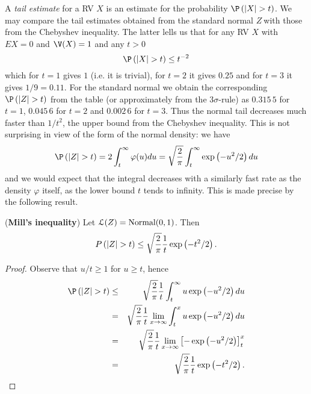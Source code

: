 A \textit{tail estimate} for a RV $X$ is an estimate for the probability $%
\P \left( \left\vert X\right\vert >t\right) $. We may compare the tail
estimates obtained from the standard normal $Z\ $with those from the
Chebyshev inequality. The latter lells us that for any RV $X$ with $EX=0$
and $\V(X)=1$ and any $t>0$ 
\begin{equation*}
\P \left( \left\vert X\right\vert >t\right) \leq t^{-2}
\end{equation*}%
which for $t=1$ gives $1$ (i.e. it is trivial), for $t=2$ it gives $0.25$
and for $t=3$ it gives $1/9=0.11$. For the standard normal we obtain the
corresponding $\P \left( \left\vert Z\right\vert >t\right) $ from the table
(or approximately from the $3\sigma $-rule) as $0.315\,5$ for $t=1$, $%
0.045\,6$ for $t=2$ and $0.002\,6$ for $t=3$. Thus the normal tail decreases
much faster than $1/t^{2}$, the upper bound from the Chebyshev inequality.
This is not surprising in view of the form of the normal density: we have 
\begin{equation*}
\P \left( \left\vert Z\right\vert >t\right) =2\int_{t}^{\infty }\varphi
(u)du=\sqrt{\frac{2}{\pi }}\int_{t}^{\infty }\exp \left( -u^{2}/2\right) du
\end{equation*}%
and we would expect that the integral decreases with a similarly fast rate
as the density $\varphi $ itself, as the lower bound $t$ tends to infinity.
This is made precise by the following result.

\begin{prop}
(\textbf{Mill's inequality}) Let $\mathcal{L}(Z)=\mbox{{\rm Normal}}(0,1)$. Then 
\begin{equation}
P\left( \left\vert Z\right\vert >t\right) \leq \sqrt{\frac{2}{\pi }}\frac{1}{%
t}\exp \left( -t^{2}/2\right) .  \label{mills-ineq}
\end{equation}
\end{prop}

\begin{proof}
Observe that $u/t\geq 1$ for $u\geq t$, hence 
\begin{eqnarray*}
\P \left( \left\vert Z\right\vert >t\right) &\leq &\sqrt{\frac{2}{\pi }}%
\frac{1}{t}\int_{t}^{\infty }u\exp \left( -u^{2}/2\right) du \\
&=&\sqrt{\frac{2}{\pi }}\frac{1}{t}\lim_{x\rightarrow \infty
}\int_{t}^{x}u\exp \left( -u^{2}/2\right) du \\
&=&\sqrt{\frac{2}{\pi }}\frac{1}{t}\lim_{x\rightarrow \infty }\left[ -\exp
\left( -u^{2}/2\right) \right] _{t}^{x} \\
&=&\sqrt{\frac{2}{\pi }}\frac{1}{t}\exp \left( -t^{2}/2\right) .
\end{eqnarray*}
\end{proof}


